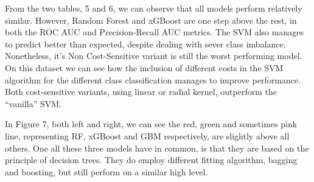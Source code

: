 \documentclass[12pt,]{article}
\begin{document}
\begin{table}

\caption{\label{tab:cr_card_model_PR}ULB Credit Card: PR Metric Model Variations}
\centering
{}
\end{table}

From the two tables, 5 and 6, we can observe that all models perform
relatively similar. However, Random Forest and xGBoost are one step
above the rest, in both the ROC AUC and Precision-Recall AUC metrics.
The SVM also manages to predict better than expected, despite dealing
with sever class imbalance. Nonetheless, it's Non Cost-Sensitive variant
is still the worst performing model. On this dataset we can see how the
inclusion of different costs in the SVM algorithm for the different
class classification manages to improve performance. Both cost-sensitive
variants, using linear or radial kernel, outperform the ``vanilla'' SVM.

In Figure 7, both left and right, we can see the red, green and
sometimes pink line, representing RF, xGBoost and GBM respectively, are
slightly above all others. One all these three models have in common, is
that they are based on the principle of decision trees. They do employ
different fitting algorithm, bagging and boosting, but still perform on
a similar high level.
\end{document}
